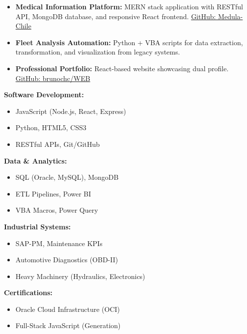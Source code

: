 \documentclass[10pt,letterpaper]{article}
\begin{document}
\vspace{0.4cm}


\vspace{0.3cm}

\begin{itemize}
    \item \textbf{Medical Information Platform:} MERN stack application with RESTful API, MongoDB database, and responsive React frontend. \href{https://github.com/Medula-Chile}{GitHub: Medula-Chile}
    \item \textbf{Fleet Analysis Automation:} Python + VBA scripts for data extraction, transformation, and visualization from legacy systems.
    \item \textbf{Professional Portfolio:} React-based website showcasing dual profile. \href{https://github.com/brunochc/WEB}{GitHub: brunochc/WEB}
\end{itemize}

\vspace{0.4cm}

\vspace{0.3cm}

\noindent
\begin{minipage}[t]{0.48\textwidth}
\textbf{Software Development:}
\begin{itemize}
    \item JavaScript (Node.js, React, Express)
    \item Python, HTML5, CSS3
    \item RESTful APIs, Git/GitHub
\end{itemize}

\vspace{0.2cm}

\textbf{Data \& Analytics:}
\begin{itemize}
    \item SQL (Oracle, MySQL), MongoDB
    \item ETL Pipelines, Power BI
    \item VBA Macros, Power Query
\end{itemize}
\end{minipage}
\hfill
\begin{minipage}[t]{0.48\textwidth}
\textbf{Industrial Systems:}
\begin{itemize}
    \item SAP-PM, Maintenance KPIs
    \item Automotive Diagnostics (OBD-II)
    \item Heavy Machinery (Hydraulics, Electronics)
\end{itemize}

\vspace{0.2cm}

\textbf{Certifications:}
\begin{itemize}
    \item Oracle Cloud Infrastructure (OCI)
    \item Full-Stack JavaScript (Generation)
\end{itemize}
\end{minipage}
\end{document}
